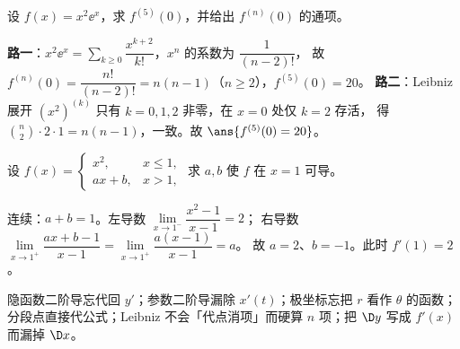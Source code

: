 \documentclass[11pt,a4paper]{ctexart}
\begin{document}
\begin{exa}
设 $f(x)=x^2\ee^x$，求 $f^{(5)}(0)$，并给出 $f^{(n)}(0)$ 的通项。
\end{exa}
\begin{solution}
\textbf{路一}：$x^2\ee^x=\sum\limits_{k\ge0}\dfrac{x^{k+2}}{k!}$，$x^n$ 的系数为 $\dfrac{1}{(n-2)!}$，
故 $f^{(n)}(0)=\dfrac{n!}{(n-2)!}=n(n-1)$（$n\ge2$），$f^{(5)}(0)=20$。
\textbf{路二}：Leibniz 展开 $(x^2)^{(k)}$ 只有 $k=0,1,2$ 非零，在 $x=0$ 处仅 $k=2$ 存活，
得 $\binom n2\cdot2\cdot1=n(n-1)$，一致。故 $\ans{f^{(5)}(0)=20}$。
\end{solution}

\begin{exa}[分段可导求参数]
设 $f(x)=\begin{cases}x^2,&x\le1,\\ ax+b,&x>1,\end{cases}$ 求 $a,b$ 使 $f$ 在 $x=1$ 可导。
\end{exa}
\begin{solution}
连续：$a+b=1$。左导数 $\lim\limits_{x\to1^-}\dfrac{x^2-1}{x-1}=2$；
右导数 $\lim\limits_{x\to1^+}\dfrac{ax+b-1}{x-1}=\lim\limits_{x\to1^+}\dfrac{a(x-1)}{x-1}=a$。
故 $a=2$、$b=-1$。此时 $f'(1)=2$。
\end{solution}

\begin{warnbox}[六型各自的坑]
隐函数二阶导忘代回 $y'$；参数二阶导漏除 $x'(t)$；极坐标忘把 $r$ 看作 $\theta$ 的函数；分段点直接代公式；Leibniz 不会「代点消项」而硬算 $n$ 项；把 $\D y$ 写成 $f'(x)$ 而漏掉 $\D x$。
\end{warnbox}
\end{document}
